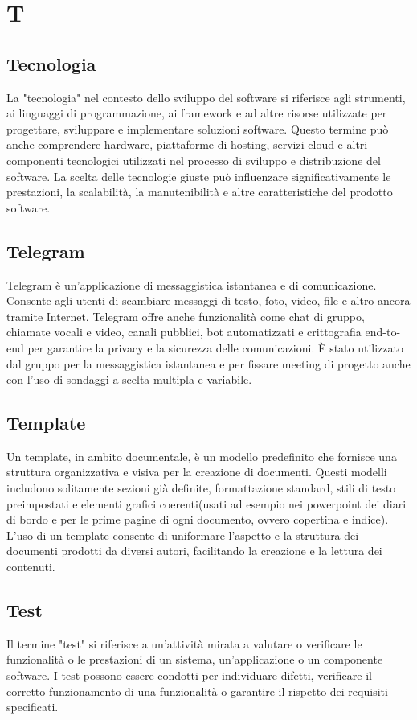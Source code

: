 \section{T} 
\subsection{Tecnologia} 
La "tecnologia" nel contesto dello sviluppo del software si riferisce agli strumenti, ai linguaggi di programmazione, ai framework e ad altre risorse utilizzate per progettare, sviluppare e implementare soluzioni software. Questo termine può anche comprendere hardware, piattaforme di hosting, servizi cloud e altri componenti tecnologici utilizzati nel processo di sviluppo e distribuzione del software. La scelta delle tecnologie giuste può influenzare significativamente le prestazioni, la scalabilità, la manutenibilità e altre caratteristiche del prodotto software. 
\subsection{Telegram} 
Telegram è un'applicazione di messaggistica istantanea e di comunicazione. Consente agli utenti di scambiare messaggi di testo, foto, video, file e altro ancora tramite Internet. Telegram offre anche funzionalità come chat di gruppo, chiamate vocali e video, canali pubblici, bot automatizzati e crittografia end-to-end per garantire la privacy e la sicurezza delle comunicazioni. È stato utilizzato dal gruppo per la messaggistica istantanea e per fissare meeting di progetto anche con l’uso di sondaggi a scelta multipla e variabile.
\subsection{Template} 
Un template, in ambito documentale, è un modello predefinito che fornisce una struttura organizzativa e visiva per la creazione di documenti. Questi modelli includono solitamente sezioni già definite, formattazione standard, stili di testo preimpostati e elementi grafici coerenti(usati ad esempio nei powerpoint dei diari di bordo e per le prime pagine di ogni documento, ovvero copertina e indice). L'uso di un template consente di uniformare l'aspetto e la struttura dei documenti prodotti da diversi autori, facilitando la creazione e la lettura dei contenuti. 
\subsection{Test} 
Il termine "test" si riferisce a un'attività mirata a valutare o verificare le funzionalità o le prestazioni di un sistema, un'applicazione o un componente software. I test possono essere condotti per individuare difetti, verificare il corretto funzionamento di una funzionalità o garantire il rispetto dei requisiti specificati. 
